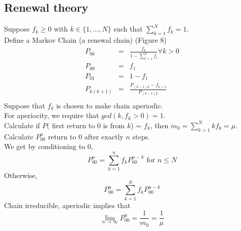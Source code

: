     \subsection*{Renewal theory}
      Suppose $f_k \ge 0$ with $k \in \{ 1, \ldots, N \}$ such that
      $\sum_{k = 1}^N f_k = 1$.\\
      Define a Markov Chain (a renewal chain)
      (Figure 8)
      \begin{eqnarray*}
        P_{0k} & = & \frac{f_k}{1 - \sum_{l = 1}^{k} f_l} \forall k > 0\\
        P_{00} & = & f_1\\
        P_{01} & = & 1 - f_1 \\
        P_{k(k+1)} & = & \frac{P_{(k-1)k} - f_{k+1}}{P_{(k-1)k}}\\
      \end{eqnarray*}
      Suppose that $f_k$ is chosen to make chain aperiodic.\\
      For aperiocity, we require that $gcd(k, f_k > 0) = 1$.\\
      Calculate if $P($ first return to 0 is from $k$) = $f_k$, then
      $m_0 = \sum_{k=1}^N kf_k = \mu$.\\
      Calculate $P_{00}^n$ return to 0 after exactly $n$ steps.\\
      We get by conditioning to 0,
      $$
        P_{00}^n = \sum_{k = 1}^n f_k P_{00}^{n-k} \text{ for } n \le N
      $$
      Otherwise,
      $$
        P_{00}^n = \sum_{k = 1}^N f_kP_{00}^{n-k}
      $$
      Chain irreducible, aperiodic implies that
      $$
        \lim_{n \to \infty} P_{00}^n = \frac{1}{m_0} = \frac{1}{\mu}
      $$

